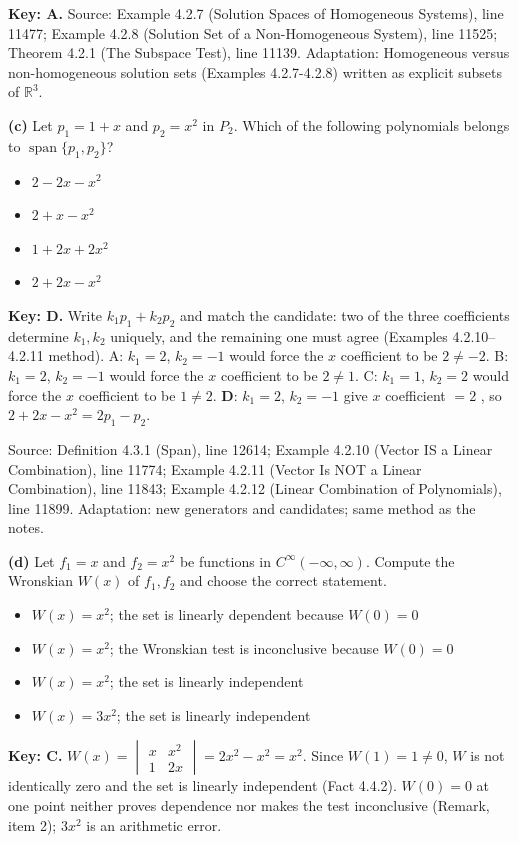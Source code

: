 \documentclass[11pt,a4paper]{article}
\newcommand{\Src}[1]{{\footnotesize\color{black!65}Source: #1}}
\begin{document}
\textbf{Key: A.} \Src{Example 4.2.7 (Solution Spaces of Homogeneous Systems), line 11477; Example 4.2.8 (Solution Set of a Non-Homogeneous System), line 11525; Theorem 4.2.1 (The Subspace Test), line 11139. Adaptation: Homogeneous versus non-homogeneous solution sets (Examples 4.2.7-4.2.8) written as explicit subsets of $\mathbb{R}^3$.}\par
\textbf{(c)} Let $p_1=1+x$ and $p_2=x^{2}$ in $P_2$. Which of the following polynomials belongs to $\operatorname{span}\{p_1,p_2\}$?\par
\begin{itemize}[leftmargin=8mm,itemsep=0pt]\item[A] $2-2x-x^{2}$\item[B] $2+x-x^{2}$\item[C] $1+2x+2x^{2}$\item[D$^{\ast}$] $2+2x-x^{2}$\end{itemize}
\textbf{Key: D.} Write $k_1p_1+k_2p_2$ and match the candidate: two of the three coefficients determine $k_1,k_2$ uniquely, and the remaining one must agree (Examples 4.2.10--4.2.11 method). A: $k_1=2$, $k_2=-1$ would force the $x$ coefficient to be $2\neq-2$. B: $k_1=2$, $k_2=-1$ would force the $x$ coefficient to be $2\neq1$. C: $k_1=1$, $k_2=2$ would force the $x$ coefficient to be $1\neq2$. \textbf{D}: $k_1=2$, $k_2=-1$ give $x$ coefficient $=2$ \checkmark, so $2+2x-x^{2}=2p_1-p_2$.\par
\Src{Definition 4.3.1 (Span), line 12614; Example 4.2.10 (Vector IS a Linear Combination), line 11774; Example 4.2.11 (Vector Is NOT a Linear Combination), line 11843; Example 4.2.12 (Linear Combination of Polynomials), line 11899. Adaptation: new generators and candidates; same method as the notes.}\par
\textbf{(d)} Let $f_1=x$ and $f_2=x^{2}$ be functions in $C^{\infty}(-\infty,\infty)$. Compute the Wronskian $W(x)$ of $f_1,f_2$ and choose the correct statement.\par
\begin{itemize}[leftmargin=8mm,itemsep=0pt]\item[A] $W(x)=x^{2}$; the set is linearly dependent because $W(0)=0$\item[B] $W(x)=x^{2}$; the Wronskian test is inconclusive because $W(0)=0$\item[C$^{\ast}$] $W(x)=x^{2}$; the set is linearly independent\item[D] $W(x)=3x^{2}$; the set is linearly independent\end{itemize}
\textbf{Key: C.} $W(x)=\begin{vmatrix}x&x^{2}\\1&2x\end{vmatrix}=2x^{2}-x^{2}=x^{2}$. Since $W(1)=1\neq0$, $W$ is not identically zero and the set is linearly independent (Fact 4.4.2). $W(0)=0$ at one point neither proves dependence nor makes the test inconclusive (Remark, item 2); $3x^2$ is an arithmetic error.\par
\end{document}

